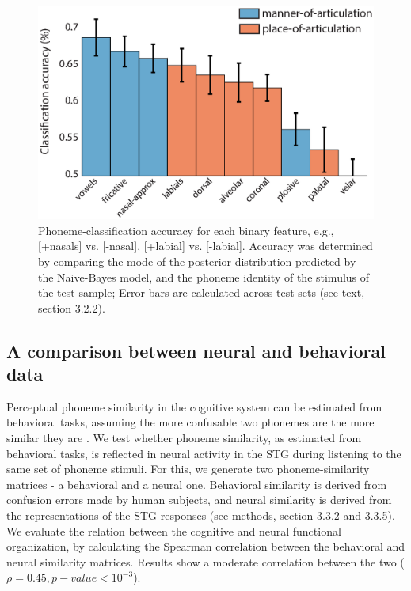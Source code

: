 \begin{figure}[h]
\vspace{.3in}
\includegraphics[width=\linewidth]{Figures/Ch3/Figure5_new.eps}
\caption{Phoneme-classification accuracy for each binary feature, e.g., [+nasals] vs. [-nasal], [+labial] vs. [-labial]. Accuracy was determined by comparing the mode of the posterior distribution predicted by the Naive-Bayes model, and the phoneme identity of the stimulus of the test sample; Error-bars are calculated across test sets (see text, section 3.2.2).}
\end{figure}

\subsection{A comparison between neural and behavioral data}
Perceptual phoneme similarity in the cognitive system can be estimated from behavioral tasks, assuming the more confusable two phonemes are the more similar they are \citep{Tversky1977, Shepard1987}. We test whether phoneme similarity, as estimated from behavioral tasks, is reflected in neural activity in the STG during listening to the same set of phoneme stimuli. For this, we generate two phoneme-similarity matrices - a behavioral and a neural one. Behavioral similarity is derived from confusion errors made by human subjects, and neural similarity is derived from the representations of the STG responses (see methods, section 3.3.2 and 3.3.5). We evaluate the relation between the cognitive and neural functional organization, by calculating the Spearman correlation between the behavioral and neural similarity matrices. Results show a moderate correlation between the two ($\rho = 0.45, p-value < 10^{-3}$).

